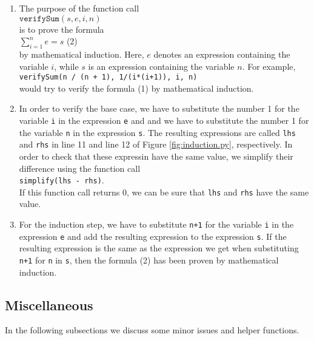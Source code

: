 \documentclass{article}
\begin{document}
\begin{enumerate}
\item The purpose of the function call
      \\[0.2cm]
      \hspace*{1.3cm}
      $\texttt{verifySum}(s, e, i, n)$
      \\[0.2cm]
      is to prove the formula
      \\[0.2cm]
      \hspace*{1.3cm}
      $\sum\limits_{i=1}^n e = s$  \hspace*{\fill} (2)
      \\[0.2cm]
      by mathematical induction.
      Here, $e$ denotes an expression containing the variable $i$, while $s$ is an expression containing
      the variable $n$.  For example, 
      \\[0.2cm]
      \hspace*{1.3cm}
      \texttt{verifySum(n / (n + 1), 1/(i*(i+1)), i, n)}
      \\[0.2cm]
      would try to verify the formula (1) by mathematical induction.
\item In order to verify the base case, we have to substitute the number 1 for the variable
      \texttt{i} in the expression \texttt{e} and and we have to substitute the number 1 for the
      variable \texttt{n} in the expression \texttt{s}.  The resulting expressions are called
      \texttt{lhs} and \texttt{rhs} in line 11 and line 12 of Figure \ref{fig:induction.py}, respectively.
      In order to check that these expressin have the same value, we simplify their difference
      using the function call
      \\[0.2cm]
      \hspace*{1.3cm}
      \texttt{simplify(lhs - rhs)}.
      \\[0.2cm]
      If this function call returns 0, we can be sure that \texttt{lhs} and \texttt{rhs} have the
      same value.
\item For the induction step, we have to substitute \texttt{n+1} for the variable \texttt{i} in the
      expression \texttt{e} and add the resulting expression to the expression \texttt{s}.  If the
      resulting expression is the same as the expression we get when substituting \texttt{n+1} for
      \texttt{n} in \texttt{s}, then the formula (2) has been proven by mathematical induction.
\end{enumerate}

\subsection{Miscellaneous}
In the following subsections we discuss some minor issues and helper functions.
\end{document}
